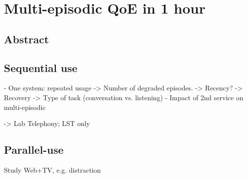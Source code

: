 \chapter{Multi-episodic QoE in 1 hour}\label{chap:06}
\section*{Abstract}

\section{Sequential use}
  - One system:  repeated usage
  -> Number of degraded episodes.
  -> Recency?
  -> Recovery
  -> Type of task (conversation vs. listening)
  - Impact of 2nd service on multi-episodic

-> Lab Telephony; LST only

\section{Parallel-use}
  Study Web+TV, e.g. distraction
